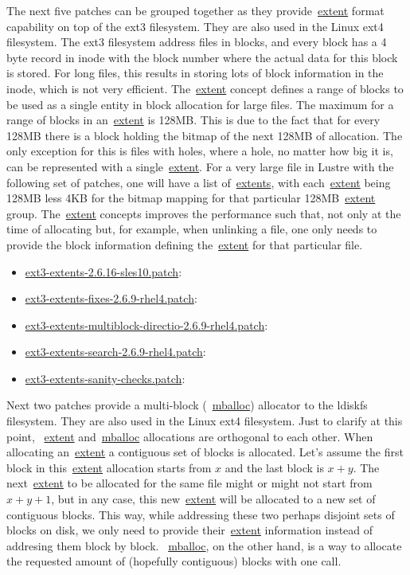 The next five patches can be grouped together as they provide~\url{extent}
format capability on top of the ext3 filesystem. They are also used in the
Linux ext4 filesystem. The ext3 filesystem address files in blocks, and every
block has a 4 byte record in inode with the block number where the actual data
for this block is stored. For long files, this results in storing lots of block
information in the inode, which is not very efficient. The~\url{extent} concept
defines a range of blocks to be used as a single entity in block allocation for
large files. The maximum for a range of blocks in an~\url{extent} is 128MB.
This is due to the fact that for every 128MB there is a block holding the
bitmap of the next 128MB of allocation. The only exception for this is files
with holes, where a hole, no matter how big it is, can be represented with a
single~\url{extent}. For a very large file in Lustre with the following set of
patches, one will have a list of~\url{extents}, with each~\url{extent} being
128MB less 4KB for the bitmap mapping for that particular 128MB~\url{extent}
group.  The~\url{extent} concepts improves the performance such that, not only
at the time of allocating but, for example, when unlinking a file, one only
needs to provide the block information defining the~\url{extent} for that
particular file.
 
\begin{itemize}

\item \url{ext3-extents-2.6.16-sles10.patch}:

\item \url{ext3-extents-fixes-2.6.9-rhel4.patch}:

\item \url{ext3-extents-multiblock-directio-2.6.9-rhel4.patch}:

\item \url{ext3-extents-search-2.6.9-rhel4.patch}:

\item \url{ext3-extents-sanity-checks.patch}:

\end{itemize}

Next two patches provide a multi-block (~\url{mballoc}) allocator to the ldiskfs
filesystem.  They are also used in the Linux ext4 filesystem. Just to clarify
at this point, ~\url{extent} and~\url{mballoc} allocations are orthogonal to
each other. When allocating an~\url{extent} a contiguous set of blocks is
allocated. Let's assume the first block in this~\url{extent} allocation starts
from $ x $ and the last block is $ x + y $. The next~\url{extent} to be
allocated for the same file might or might not start from $ x + y + 1 $, but in
any case, this new~\url{extent} will be allocated to a new set of contiguous
blocks. This way, while addressing these two perhaps disjoint sets of
blocks on disk, we only need to provide their~\url{extent} information instead
of addresing them block by block. ~\url{mballoc}, on the other hand, is a way
to allocate the requested amount of (hopefully contiguous) blocks with one call.


